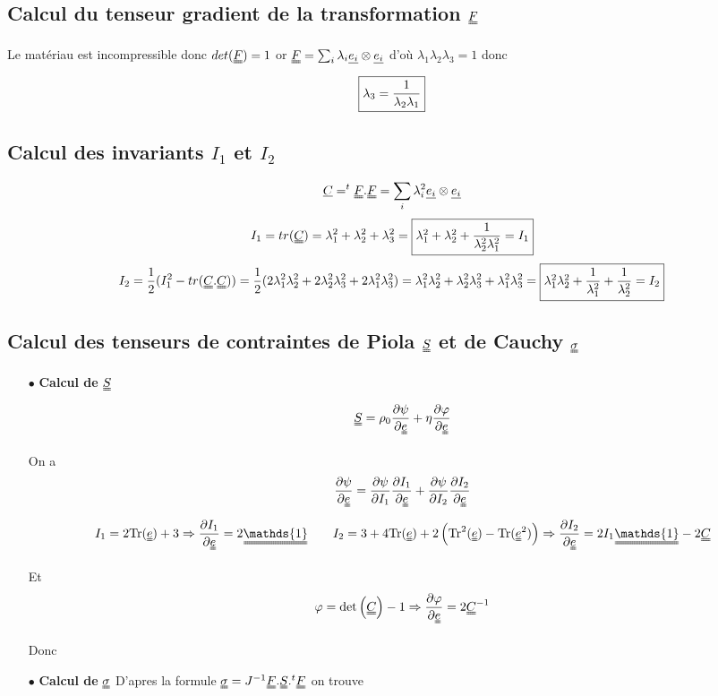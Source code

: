 \documentclass[a4paper,11pt]{article}
\begin{document}
\subsection{Calcul du tenseur gradient de la transformation $\uuline{F}$}
Le matériau est incompressible donc $det(\uuline{F})=1$ or $\uuline{F}=\sum_{i} \lambda_i \uline{e_i}\otimes \uline{e_i}$ d'où $\lambda_1\lambda_2\lambda_3=1$ donc $$\fbox{$\lambda_3=\dfrac{1}{\lambda_2\lambda_1} $}$$

\subsection{Calcul des invariants $I_1$ et $I_2$}
$$\uline{C}=^t\uuline{F}.\uuline{F}=\sum_{i} \lambda_i ^2\uline{e_i}\otimes \uline{e_i}$$
$$I_1= tr(\uuline{C})=\lambda_1^2+\lambda_2^2+\lambda_3^2=\fbox{$\lambda_1^2+\lambda_2^2+\dfrac{1}{\lambda_2^2\lambda_1^2}=I_1$}$$
$$I_2=\frac{1}{2}(I_1^2 - tr(\uuline{C}.\uuline{C})) =\frac{1}{2}(2\lambda_1^2\lambda_2^2+2\lambda_2^2\lambda_3^2+2\lambda_1^2\lambda_3^2) =\lambda_1^2\lambda_2^2+\lambda_2^2\lambda_3^2+\lambda_1^2\lambda_3^2 =\fbox{$\lambda_1^2\lambda_2^2+\dfrac{1}{\lambda_1^2}+\dfrac{1}{\lambda_2^2}=I_2$}$$

\subsection{Calcul des tenseurs de contraintes de Piola $\uuline{S}$ et de Cauchy $\uuline{\sigma}$}
\begin{itemize}
	\item[$\bullet$ \textbf{Calcul de} $\uuline{S}$] $$ \uuline{S} = \rho_0 \frac{\partial \psi}{\partial \uuline{e}} + \eta\frac{\partial \varphi}{\partial \uuline{e}} $$
	
	On a $$\frac{\partial \psi}{\partial \uuline{e}}= \frac{\partial \psi}{\partial I_1}\frac{\partial I_1}{\partial \uuline{e}}+\frac{\partial \psi}{\partial I_2}\frac{\partial I_2}{\partial \uuline{e}}$$
 $$I_1=2\text{Tr}(\uuline{e})+3\Rightarrow \frac{\partial I_1}{\partial \uuline{e}}= 2\uuline{\mathds{1}} \quad \quad I_2=3+4\text{Tr}(\uuline{e})+2\left(\text{Tr}^2(\uuline{e})-\text{Tr}(\uuline{e}^2)\right)
 \Rightarrow \frac{\partial I_2}{\partial \uuline{e}}= 2 I_1\uuline{\mathds{1}}-2\uuline{C}   $$

Et 	$$\varphi=\text{det}\left(\uuline{C}\right)-1 \Rightarrow  \frac{\partial \varphi}{\partial \uuline{e}}= 2\uuline{C}^{-1}$$

Donc 

	\item[$\bullet$ \textbf{Calcul de} $\uuline{\sigma}$] D'apres la formule $\uuline{\sigma}=J^{-1}\uuline{F}.\uuline{S}.{}^t\uuline{F} $ on trouve 
	

\end{itemize}
\end{document}
